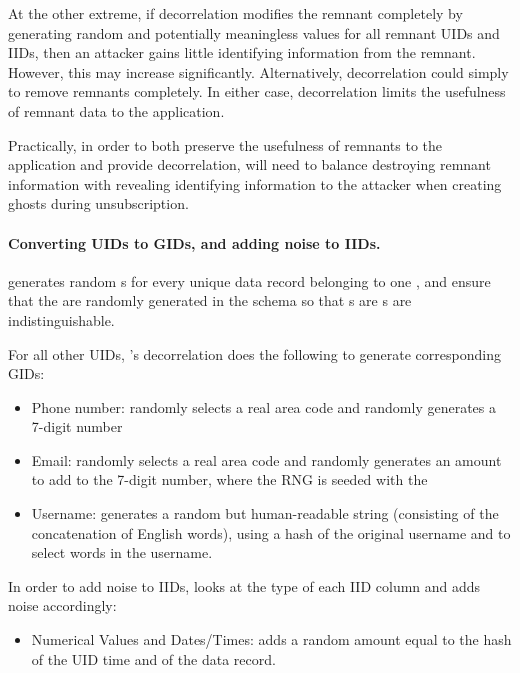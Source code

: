 At the other extreme, if decorrelation modifies the remnant completely by generating random and
potentially meaningless values for all remnant UIDs and IIDs, then an attacker gains little identifying
information from the remnant. However, this may increase \premnant{} significantly.
Alternatively, decorrelation could simply to remove remnants completely. In either case, decorrelation limits the usefulness of remnant data to the application. 

Practically, in order to both preserve the usefulness of remnants to the application and provide
decorrelation, \sys{} will need to balance destroying remnant information with revealing identifying
information to the attacker when creating ghosts during unsubscription. 

\paragraph{Converting UIDs to GIDs, and adding noise to IIDs.}
\sys{} generates random \gidkey{}s for every unique data record belonging to one
\uidkey{}, and ensure that the \uidkey{} are randomly generated in the schema so
that \gidkey{}s are \uidkey{}s are indistinguishable.

For all other UIDs, \sys's decorrelation does the following to generate corresponding GIDs:
\begin{itemize}
    \item Phone number: randomly selects a real area code and randomly generates a 7-digit number
    \item Email: randomly selects a real area code and randomly generates an amount to add to the 7-digit number, where the RNG is seeded with the \gidkey{}
    \item Username: generates a random but human-readable string (consisting of the
        concatenation of English words), using a hash of the original username and
        \gidkey{} to select words in the username.
\end{itemize}

In order to add noise to IIDs, \sys{} looks at the type of each IID column and
adds noise accordingly:
\begin{itemize}
\item Numerical Values and Dates/Times: adds a random amount equal to the
         hash of the UID time and \gidkey{} of the data record.
\end{itemize}

